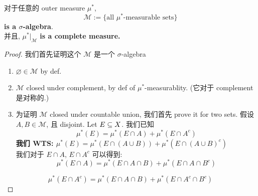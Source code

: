 \documentclass[lang=cn,11pt]{elegantbook}
\begin{document}
\begin{theorem}
\label{Carathéodory's Theorem}
对于任意的 outer measure $\mu^*$, 
\[
\mathcal{M} := \{ \text{all } \mu^* \text{-measurable sets}    \}
\]\textbf{is a $\sigma$-algebra}.\\
并且, $\mu^* |_\mathcal{M}$ \textbf{is a complete measure.}
\end{theorem}
\begin{proof}
我们首先证明这个 $\mathcal{M}$ 是一个 $\sigma$-algebra
\begin{enumerate}
    \item  $\varnothing \in \mathcal{M}$ by def.
    \item $\mathcal{M}$ closed under complement, by def of $\mu^*$-measurablity. (它对于 complement 是对称的.)
    \item 为证明 $\mathcal{M}$ closed under countable union, 我们首先 prove it for two sets.
    假设 $A, B \in \mathcal{M}$, 且 disjoint. 
    Let $E \subseteq X$.
    我们已知 
    \begin{equation}
        \mu^*(E) = \mu^*(E \cap A) + \mu^*(E \cap A^c)
    \end{equation}
 \textbf{我们 WTS: $\mu^*(E) = \mu^*(E \cap (A\cup B)) + \mu^*(E \cap (A\cup B)^c)$}\\
\noindent 我们对于 $E \cap A$, $E\cap A^c$ 可以得到: \begin{equation}
    \mu^*(E \cap A) = \mu^*(E\cap A \cap B) + \mu^*(E \cap A \cap B^c)
\end{equation}
\end{enumerate}
\begin{equation}
    \mu^*(E \cap A^c) = \mu^*(E \cap A \cap B) + \mu^*(E\cap A^c \cap  B^c)
\end{equation}


\end{proof}
\end{document}
